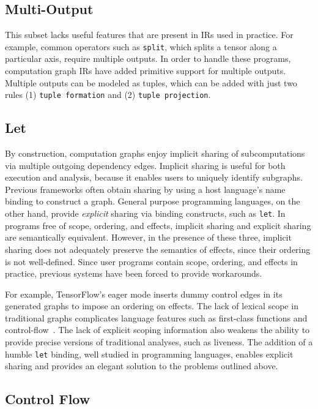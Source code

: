   \subsection{Multi-Output}

  This subset lacks useful features that are present in IRs used
    in practice.
  For example, common operators such as \verb|split|, which splits
    a tensor along a particular axis, require multiple outputs.
  In order to handle these programs,
    computation graph IRs have added primitive support
    for multiple outputs.
  Multiple outputs can be modeled as tuples, which can
    be added with just two rules (1) \verb|tuple formation|
    and (2) \verb|tuple projection|.

  \subsection{Let}

  By construction, computation graphs enjoy implicit sharing of subcomputations via multiple outgoing
  dependency edges.
  Implicit sharing is useful for both execution and analysis,
    because it enables users to uniquely identify subgraphs.
  Previous frameworks often obtain sharing by using a host
    language's name binding to construct a graph.
  General purpose programming languages, on the other hand, provide \textit{explicit}
    sharing via binding constructs, such as \verb|let|.
  In programs free of scope, ordering, and effects, implicit sharing
    and explicit sharing are semantically equivalent.
  However, in the presence of these three, implicit sharing does not adequately preserve the semantics
    of effects, since their ordering is not well-defined.
  Since user programs contain scope, ordering, and effects in practice,
    previous systems have been forced to provide workarounds.

  For example, TensorFlow's eager mode inserts dummy control edges
    in its generated graphs to impose an ordering on effects.
  The lack of lexical scope in traditional graphs complicates language features
    such as first-class functions and control-flow~\cite{funarg, funarg_sol}.
  The lack of explicit scoping information also weakens the ability
    to provide precise versions of traditional analyses, such as liveness.
  The addition of a humble \verb|let| binding, well studied in programming languages,
    enables explicit sharing and provides an elegant solution to the problems outlined above.

  \subsection{Control Flow}

